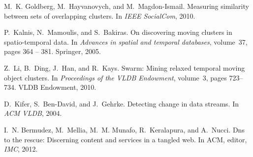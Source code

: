 \documentclass{acm_proc_article-sp}
\begin{document}
\begin{thebibliography}{10}
M.~K. Goldberg, M.~Hayvanovych, and M.~Magdon-Ismail.
\newblock Measuring similarity between sets of overlapping clusters.
\newblock In {\em IEEE SocialCom}, 2010.

P.~Kalnis, N.~Mamoulis, and S.~Bakiras.
\newblock On discovering moving clusters in spatio-temporal data.
\newblock In {\em Advances in spatial and temporal databases}, volume~37, pages
  364 -- 381. Springer, 2005.

Z.~Li, B.~Ding, J.~Han, and R.~Kays.
\newblock Swarm: Mining relaxed temporal moving object clusters.
\newblock In {\em Proceedings of the VLDB Endowment}, volume~3, pages 723--734.
  VLDB Endowment, 2010.

D.~Kifer, S.~Ben-David, and J.~Gehrke.
\newblock Detecting change in data streams.
\newblock In {\em ACM VLDB}, 2004.

I.~N. Bermudez, M.~Mellia, M.~M. Munafo, R.~Keralapura, and A.~Nucci.
\newblock Dns to the rescue: Discerning content and services in a tangled web.
\newblock In ACM, editor, {\em IMC}, 2012.

\end{thebibliography}
\end{document}
